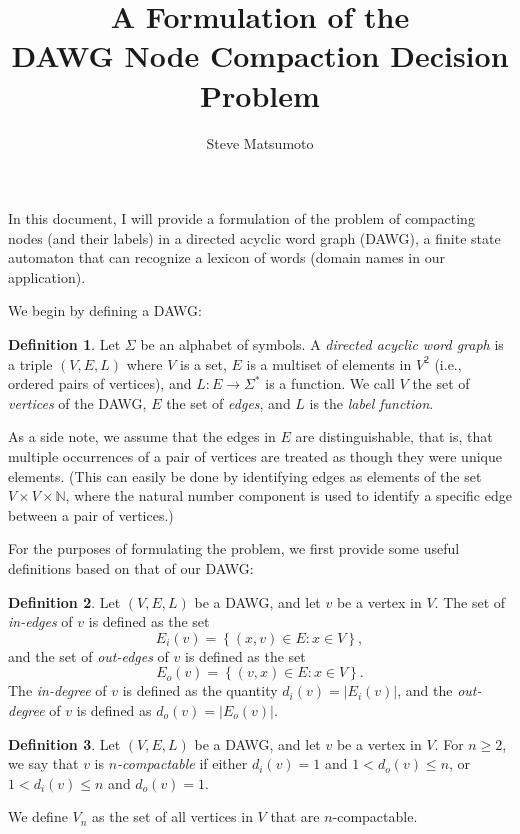 \documentclass{article}
\title{A Formulation of the\\DAWG Node Compaction Decision Problem}
\author{Steve Matsumoto}
\newcommand{\emxs}[1]{\ensuremath{#1}\xspace}
\newcommand{\alphabet}{\emxs{\Sigma}}
\newcommand{\edges}{\emxs{E}}
\newcommand{\labelfunc}{\emxs{L}}
\newcommand{\nats}{\emxs{\mathbb{N}}}
\newcommand{\vertices}{\emxs{V}}
\newcommand{\strings}{\emxs{\alphabet^*}}
\theoremstyle{definition}
\newtheorem{definition}{Definition}
\begin{document}
\maketitle

In this document, I will provide a formulation of the problem of compacting
nodes (and their labels) in a directed acyclic word graph (DAWG), a finite state
automaton that can recognize a lexicon of words (domain names in our
application).

We begin by defining a DAWG:

\begin{definition}
  Let \alphabet be an alphabet of symbols. A \emph{directed acyclic word graph}
  is a triple $(\vertices, \edges, \labelfunc)$ where \vertices is a set, \edges
  is a multiset of elements in $\vertices^2$ (i.e., ordered pairs of vertices),
  and $\labelfunc: \edges \to \strings$ is a function. We call \vertices the set
  of \emph{vertices} of the DAWG, \edges the set of \emph{edges}, and \labelfunc
  is the \emph{label function}.
  \label{def:dawg}
\end{definition}

As a side note, we assume that the edges in \edges are distinguishable, that is,
that multiple occurrences of a pair of vertices are treated as though they were
unique elements. (This can easily be done by identifying edges as elements of
the set $\vertices \times \vertices \times \nats$, where the natural number
component is used to identify a specific edge between a pair of vertices.)

For the purposes of formulating the problem, we first provide some useful
definitions based on that of our DAWG:

\begin{definition}
  Let $(\vertices, \edges, \labelfunc)$ be a DAWG, and let $v$ be a vertex in
  \vertices. The set of \emph{in-edges} of $v$ is defined as the set
  \[
    \edges_i(v) = \left\{ (x, v) \in \edges: x \in \vertices \right\},
  \]
  and the set of \emph{out-edges} of $v$ is defined as the set
  \[
    \edges_o(v) = \left\{ (v, x) \in \edges: x \in \vertices \right\}.
  \]
  The \emph{in-degree} of $v$ is defined as the quantity $d_i(v) =
  |\edges_i(v)|$, and the \emph{out-degree} of $v$ is defined as $d_o(v) =
  |\edges_o(v)|$.
\end{definition}

\begin{definition}
  Let $(\vertices, \edges, \labelfunc)$ be a DAWG, and let $v$ be a vertex in
  \vertices. For $n \ge 2$, we say that $v$ is \emph{$n$-compactable} if either
  $d_i(v) = 1$ and $1 < d_o(v) \le n$, or $1 < d_i(v) \le n$ and $d_o(v) = 1$.

  We define $\vertices_n$ as the set of all vertices in \vertices that are
  $n$-compactable.
\end{definition}
\end{document}
